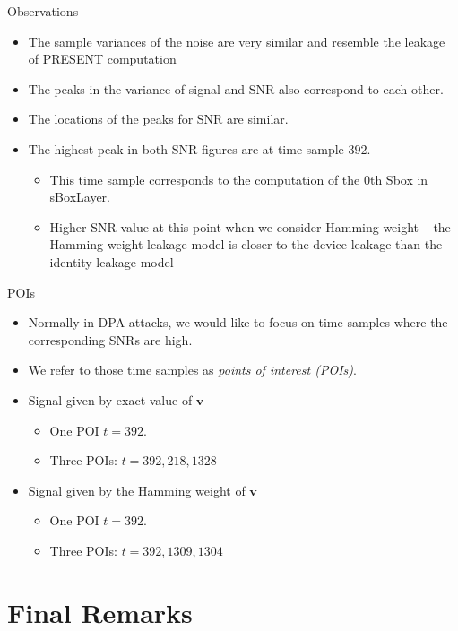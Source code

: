 \begin{frame}{Observations}
    \begin{itemize}
        \item The sample variances of the noise are very similar and resemble the leakage of PRESENT computation
        \item The peaks in the variance of signal and SNR also correspond to each other.
        \item The locations of the peaks for SNR are similar.
        \item The highest peak in both SNR figures are at time sample $392$.
\begin{itemize}
    \item This time sample corresponds to the computation of the $0$th Sbox in sBoxLayer.
    \item Higher SNR value at this point when we consider Hamming weight -- the Hamming weight leakage model is closer to the device leakage than the identity leakage model
\end{itemize}
    \end{itemize}
\end{frame}

\begin{frame}{POIs}
    \begin{itemize}
        \item Normally in DPA attacks, we would like to focus on time samples where the corresponding SNRs are high.
        \item We refer to those time samples as \textit{points of interest (POIs)}.
        \item Signal given by exact value of $\boldsymbol{v}$
        \begin{itemize}
             \item One POI $t=392$.
             \item Three POIs: $t=392,218,1328$
        \end{itemize}
        \item Signal given by the Hamming weight of $\boldsymbol{v}$
        \begin{itemize}
             \item One POI $t=392$.
             \item Three POIs: $t=392,1309,1304$
        \end{itemize}
    \end{itemize}
\end{frame}

\section{Final Remarks}
\begin{frame}{\VideoName}
    \tableofcontents[currentsection]
\end{frame}

